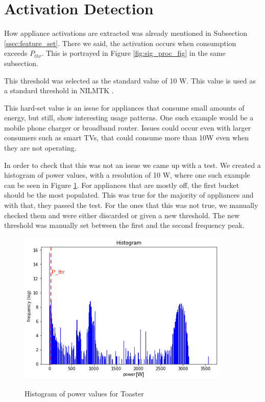 \section{Activation Detection}

How appliance activations are extracted was already mentioned in Subsection \ref{ssec:feature_set}.
There we said, the activation occurs when consumption exceeds $P_{thr}$.
This is portrayed in Figure \ref{fig:sig_proc_fig} in the same subsection.

This threshold was selected as the standard value of 10 W.
This value is used as a standard threshold in NILMTK \cite{nilmtk}.

This hard-set value is an issue for appliances that consume small amounts of energy,
but still, show interesting usage patterns.
One such example would be a mobile phone charger or broadband router.
Issues could occur even with larger consumers such as smart TVs, that could consume more than 10W even when they are not operating.

In order to check that this was not an issue we came up with a test.
We created a histogram of power values, with a resolution of 10 W, where one such example can be seen in Figure \ref{fig:freq_pthr}.
For appliances that are mostly off, the first bucket should be the most populated.
This was true for the majority of appliances and with that, they passed the test.
For the ones that this was not true, we manually checked them and were either discarded or given a new threshold.
The new threshold was manually set between the first and the second frequency peak. 

\begin{figure}[H]
	\centering
	\caption{Histogram of power values for Toaster}
	\includegraphics[width=0.9\textwidth]{Figures/profile_sketches/freq_pthr.png}
	\label{fig:freq_pthr}
\end{figure}

